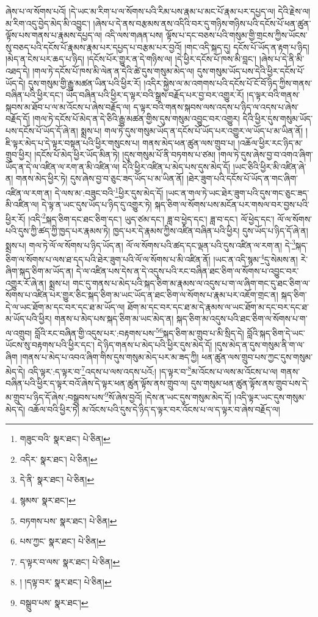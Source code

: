 ཞེས་པ་ལ་སོགས་པའོ། །དེ་ཡང་མ་རིག་པ་ལ་སོགས་པའི་རིམ་པས་རྣམ་པ་མང་པོ་རྣམ་པར་དཔྱད་ལ། དེའི་རྗེས་ལ། མ་རིག་འདུ་བྱེད་མེད་མི་འབྱུང་། །ཞེས་པ་དེ་ནས་བརྩམས་ནས་འདིའི་བར་དུ་གཉིས་གཉིས་པའི་དངོས་པོ་ཕན་ཚུན་ལྟོས་པས་གནས་པ་རྣམས་དཔྱད་ལ། འདི་ལས་གཞན་པས། ལྟོས་པ་དང་བཅས་པའི་གསུམ་གྱི་གྲངས་ཀྱིས་ཡོངས་སུ་བཅད་པའི་དངོས་པོ་རྣམས་རྣམ་པར་དཔྱད་པ་བརྩམ་པར་བྱའོ། །གང་འདི་སྐད་དུ། དངོས་པོ་ཡོད་ན་རྟག་པ་ཉིད། །མེད་ན་ངེས་པར་ཆད་པ་ཉིད། །དངོས་པོར་གྱུར་ན་དེ་གཉིས་ལ། །དེ་ཕྱིར་དངོས་པོ་ཁས་མི་བླང་། །ཞེས་པ་དེ་ནི་མི་འཐད་དེ། །གལ་ཏེ་དངོས་པོ་ཁས་མི་ལེན་ན་དེའི་ཚེ་དུས་གསུམ་མེད་ལ། དུས་གསུམ་ཡོད་པས་དེའི་ཕྱིར་དངོས་པོ་ཡོད་དེ། དུས་གསུམ་གྱི་རྒྱུ་མཚན་ཡིན་པའི་ཕྱིར་རོ། །འདིར་སྐྱེས་ལ་མ་འགགས་པའི་དངོས་པོ་ངོ་བོ་ཉིད་ཀྱིས་གནས་བཞིན་པའི་ཕྱིར་དང་། ཡོད་བཞིན་པའི་ཕྱིར་ད་ལྟར་བའི་སྒྲས་བརྗོད་པར་བྱ་བར་འགྱུར་རོ། །ད་ལྟར་བའི་གནས་སྐབས་མ་ཐོབ་པ་ལ་མ་འོངས་པ་ཞེས་བརྗོད་ལ། ད་ལྟར་བའི་གནས་སྐབས་ལས་འདས་པ་ཉིད་ལ་འདས་པ་ཞེས་བརྗོད་དོ། །གལ་ཏེ་དངོས་པོ་མེད་ན་དེ་ཅིའི་རྒྱུ་མཚན་གྱིས་དུས་གསུམ་འབྱུང་བར་འགྱུར། དེའི་ཕྱིར་དུས་གསུམ་ཡོད་པས་དངོས་པོ་ཡོད་དོ་ཞེ་ན། སྨྲས་པ། གལ་ཏེ་དུས་གསུམ་ཡོད་ན་དངོས་པོ་ཡོད་པར་འགྱུར་ལ་ཡོད་པ་མ་ཡིན་ནོ། །ཇི་ལྟར་མེད་པ་དེ་ལྟར་བསྟན་པའི་ཕྱིར་གསུངས་པ། གནས་མེད་ཕན་ཚུན་ལས་གྲུབ་པ། །འཆོལ་ཕྱིར་རང་ཉིད་མ་གྲུབ་ཕྱིར། །དངོས་པོ་མེད་ཕྱིར་ཡོད་མིན་ཏེ། །དུས་གསུམ་པོ་ནི་བཏགས་པ་ཙམ། །གལ་ཏེ་དུས་ཞེས་བྱ་བ་འགའ་ཞིག་ཡོད་ན་དེ་ལ་འཛིན་ལ་རག་ན་མི་འཛིན་ལ། དེའི་ཕྱིར་འཛིན་པ་མེད་པས་དུས་མེད་དོ། །ཡང་ཅིའི་ཕྱིར་མི་འཛིན་ཞེ་ན། གནས་མེད་ཕྱིར་ཏེ། དུས་ཞེས་བྱ་བ་ཅུང་ཟད་ཡོད་པ་མ་ཡིན་ནོ། །ཐེར་ཟུག་པའི་དངོས་པོ་ཡོད་ན་གང་ཞིག་འཛིན་ལ་རག་ན། དེ་ལས་མ་:བཟུང་བའི་\footnote{གཟུང་བའི་  སྣར་ཐང་།  པེ་ཅིན། }ཕྱིར་དུས་མེད་དོ། །ཡང་ན་གལ་ཏེ་ཡང་ཐེར་ཟུག་པའི་དུས་གང་ཅུང་ཟད་མི་འཛིན་ལ། དེ་ལྟ་ན་ཡང་དུས་ཡོད་པ་ཉིད་དུ་འགྱུར་ཏེ། སྐད་ཅིག་ལ་སོགས་པས་མངོན་པར་གསལ་བར་བྱས་པའི་ཕྱིར་རོ། །འདི་\footnote{འདིར་  སྣར་ཐང་།  པེ་ཅིན། }སྐད་ཅིག་དང་ཐང་ཅིག་དང་། ཡུད་ཙམ་དང་། ཟླ་བ་ཕྱེད་དང་། ཟླ་བ་དང་། ལོ་ཕྱེད་དང་། ལོ་ལ་སོགས་པའི་དུས་ཀྱི་ཚད་ཀྱི་ཁྱད་པར་རྣམས་ཏེ། ཁྱད་པར་དེ་རྣམས་ཀྱིས་འཛིན་བཞིན་པའི་ཕྱིར། དུས་ཡོད་པ་ཉིད་དོ་ཞེ་ན། སྨྲས་པ། གལ་ཏེ་ལོ་ལ་སོགས་པ་ཉིད་ཡོད་ན། ལོ་ལ་སོགས་པའི་ཚད་དང་ལྡན་པའི་དུས་འཛིན་ལ་རག་ན། དེ་\footnote{དེ་ནི་  སྣར་ཐང་།  པེ་ཅིན། }སྐད་ཅིག་ལ་སོགས་པ་ལས་ཐ་དད་པའི་ཐེར་ཟུག་པའི་ལོ་ལ་སོགས་པ་མི་འཛིན་ནོ། །ཡང་ན་འདི་སྙམ་\footnote{སྙམས་  སྣར་ཐང་། }དུ་སེམས་ན། རེ་ཞིག་སྐད་ཅིག་མ་ཡོད་ན། དེ་ལ་འཛིན་པས་དེས་ན་དེ་འདུས་པའི་རང་བཞིན་ཐང་ཅིག་ལ་སོགས་པ་འབྱུང་བར་འགྱུར་རོ་ཞེ་ན། སྨྲས་པ། གང་དུ་གནས་པ་མེད་པའི་སྐད་ཅིག་མ་རྣམས་ལ་འདུས་པ་ག་ལ་ཞིག་གང་དུ་ཐང་ཅིག་ལ་སོགས་པ་འཛིན་པར་གྱུར་ཅིང་སྐད་ཅིག་མ་ཡང་ཡོད་ན་ཐང་ཅིག་ལ་སོགས་པ་རྣམ་པར་འཇོག་གྲང་ན། སྐད་ཅིག་དེ་ལ་ཡང་ཐོག་མ་དང་བར་དང་ཐ་མ་ཡོད་ལ། ཐོག་མ་དང་བར་དང་ཐ་མ་དེ་རྣམས་ལ་ཡང་ཐོག་མ་དང་བར་དང་ཐ་མ་ཡོད་པའི་ཕྱིར། གནས་པ་མེད་པས་སྐད་ཅིག་མ་ཡང་མེད་ན། སྐད་ཅིག་མ་འདུས་པའི་ཐང་ཅིག་ལ་སོགས་པ་ག་ལ་འགྲུབ། བློའི་རང་བཞིན་གྱི་འདུས་པར་:བརྟགས་པས་\footnote{བཏགས་པས་  སྣར་ཐང་།  པེ་ཅིན། }\footnote{པས་ཀྱང་  སྣར་ཐང་།  པེ་ཅིན། }སྐད་ཅིག་མ་གྲུབ་པ་མི་སྲིད་དེ། བློའི་སྐད་ཅིག་དེ་ཡང་ཡོངས་སུ་བརྟགས་པའི་ཕྱིར་དང་། དེ་ཉིད་གནས་པ་མེད་པའི་ཕྱིར་དུས་མེད་དོ། །དུས་མེད་ན་དུས་གསུམ་ནི་ག་ལ་ཞིག །གནས་པ་མེད་པ་འབའ་ཞིག་གིས་དུས་གསུམ་མེད་པར་མ་ཟད་ཀྱི། ཕན་ཚུན་ལས་གྲུབ་པས་ཀྱང་དུས་གསུམ་མེད་དེ། འདི་ལྟར་:ད་ལྟར་བ་\footnote{ད་ལྟར་བ་ལས་  སྣར་ཐང་།  པེ་ཅིན། }འདས་པ་ལས་འདས་པའོ:། །ད་ལྟར་བ་\footnote{། །དལྟ་བར་  སྣར་ཐང་།  པེ་ཅིན། }མ་འོངས་པ་ལས་མ་འོངས་པ་ལ། གནས་བཞིན་པའི་ཕྱིར་ད་ལྟར་བའོ་ཞེས་དེ་ལྟར་ཕན་ཚུན་ལྟོས་ནས་གྲུབ་ལ། དུས་གསུམ་ཕན་ཚུན་ལྟོས་ནས་གྲུབ་པས་དེ་མ་གྲུབ་པ་ཉིད་དོ་ཞེས་:བསྒྲུབས་པས་\footnote{བསྒྲུབ་པས་  སྣར་ཐང་། }སོ་ཞེས་བྱའོ། །དེས་ན་ཡང་དུས་གསུམ་མེད་དོ། །འདི་ལྟར་ཡང་དུས་གསུམ་མེད་དེ། འཆོལ་བའི་ཕྱིར་ཏེ། མ་འོངས་པའི་དུས་དེ་ཉིད་ད་ལྟར་བར་འོངས་པ་ལ་ད་ལྟར་བ་ཞེས་བརྗོད་ལ། 